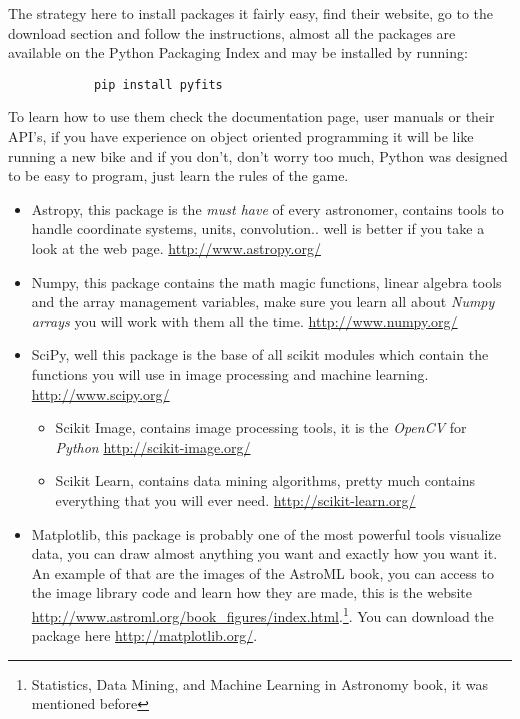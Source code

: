 \documentclass[11pt,fleqn]{book} %
\begin{document}
\begin{description}
\begin{description}
        The strategy here to install packages it fairly easy, find their website, go to the download section and follow the instructions, almost all the packages are available on the Python Packaging Index and may be installed by running:
        \begin{verbatim}
        	pip install pyfits
        \end{verbatim}
        To learn how to use them check the documentation page, user manuals or their API's, if you have experience on object oriented programming it will be like running a new bike and if you don't, don't worry too much, Python was designed to be easy to program, just learn the rules of the game.
        	\begin{itemize}
            	\item Astropy, this package is the \emph{must have} of every astronomer, contains tools to handle coordinate systems, units, convolution.. well is better if you take a look at the web page. \url{http://www.astropy.org/}
                \item Numpy, this package contains the math magic functions, linear algebra tools and the array management variables, make sure you learn all about \emph{Numpy arrays} you will work with them all the time. \url{http://www.numpy.org/}
                \item SciPy, well this package is the base of all scikit modules which contain the functions you will use in image processing and machine learning. \url{http://www.scipy.org/}
                	\begin{itemize}
                    	\item Scikit Image, contains image processing tools, it is the \emph{OpenCV} for \emph{Python} \url{http://scikit-image.org/}
                        \item Scikit Learn, contains data mining algorithms, pretty much contains everything that you will ever need. \url{http://scikit-learn.org/}
                    \end{itemize}
                \item Matplotlib, this package is probably one of the most powerful tools visualize data, you can draw almost anything you want and exactly how you want it. An example of that are the images of the AstroML book, you can access to the image library code and learn how they are made, this is the website \url{http://www.astroml.org/book_figures/index.html}.\footnote{Statistics, Data Mining, and Machine Learning in Astronomy book, it was mentioned before}. You can download the package here \url{http://matplotlib.org/}.

\end{itemize}
\end{description}
\end{description}
\end{document}
